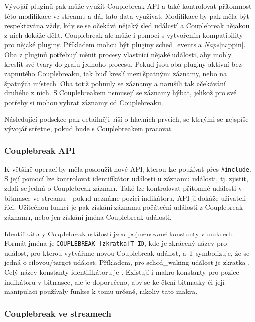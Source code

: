Vývojář pluginů pak může využít Couplebreak API a také kontrolovat přítomnost této modifikace ve streamu a dál tato data využívat. Modifikace by pak měla být respektována vždy, kdy se se očekává nějaký sled událostí a Couplebreak nějakou z nich dokáže dělit. Couplebreak ale může i pomoci s vytvořením kompatibility pro nějaké pluginy. Příkladem mohou být pluginy sched\_events a \emph{Naps}\ref{nappin}. Oba z pluginů potřebují měnit procesy vlastnící nějaké události, aby mohly kreslit své tvary do grafu jednoho procesu. Pokud jsou oba pluginy aktivní bez zapnutého Couplebreaku, tak buď kreslí mezi špatnými záznamy, nebo na špatných místech. Oba totiž pohnuly se záznamy a narušili tak očekávání druhého z nich. S Couplebreakem nemusejí se záznamy hýbat, jelikož pro své potřeby si mohou vybrat záznamy od Couplebreaku.

Následující podsekce pak detailněji píší o hlavních prvcích, se kterými se nejspíše vývojář střetne, pokud bude s Couplebreakem pracovat.

\subsubsection*{Couplebreak API}

K většině operací by měla posloužit nové API, kterou lze používat přes \texttt{\#include}. S její pomocí lze kontrolovat identifikátor události u záznamu události, tj. zjistit, zdali se jedná o Couplebreak záznam. Také lze kontrolovat přítomné události v bitmasce ve streamu - pokud neznáme pozici indikátoru, API ji dokáže uživateli říci. Užitečnou funkcí je pak získání záznamu počáteční události z Couplebreak záznamu, nebo jen získání jména Couplebreak události.

Identifikátory Couplebreak událostí jsou pojmenované konstanty v makrech. Formát jména je \texttt{COUPLEBREAK\_[zkratka]T\_ID}, kde \uv{[zkratka]} je zkrácený název pro událost, pro kterou vytváříme novou Couplebreak událost, a T symbolizuje, že se jedná o cílovou/target událost. Příkladem, pro sched\_waking událost je zkratka . Celý název konstanty identifikátoru je . Existují i makro konstanty pro pozice indikátorů v bitmasce, ale je doporučeno, aby se ke čtení bitmasky či její manipulaci používaly funkce k tomu určené, nikoliv tato makra.

\subsubsection*{Couplebreak ve streamech}

